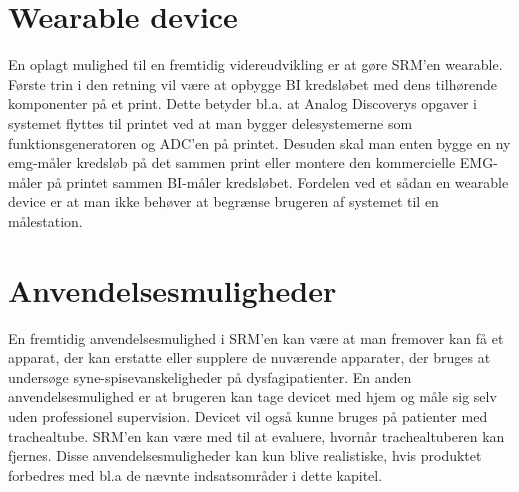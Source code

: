 \section{Wearable device}
En oplagt mulighed til en fremtidig videreudvikling er at gøre SRM'en wearable. Første trin i den retning vil være at opbygge BI kredsløbet med dens tilhørende komponenter på et print. Dette betyder bl.a. at Analog Discoverys opgaver i systemet flyttes til printet ved at man bygger delesystemerne som funktionsgeneratoren og ADC'en på printet. Desuden skal man enten bygge en ny emg-måler kredsløb på det sammen print eller montere den kommercielle EMG-måler på printet sammen BI-måler kredsløbet. Fordelen ved et sådan en wearable device er at man ikke behøver at begrænse brugeren af systemet til en målestation.   


\section{Anvendelsesmuligheder}
En fremtidig anvendelsesmulighed i SRM'en kan være at man fremover kan få et apparat, der kan erstatte eller supplere de nuværende apparater, der bruges at undersøge syne-spisevanskeligheder på dysfagipatienter. En anden anvendelsesmulighed er at brugeren kan tage devicet med hjem og måle sig selv uden professionel supervision. Devicet vil også kunne bruges på  patienter med trachealtube. SRM'en kan være med til at evaluere, hvornår trachealtuberen kan fjernes. Disse anvendelsesmuligheder kan kun blive realistiske, hvis produktet forbedres med bl.a de nævnte indsatsområder i dette kapitel.     